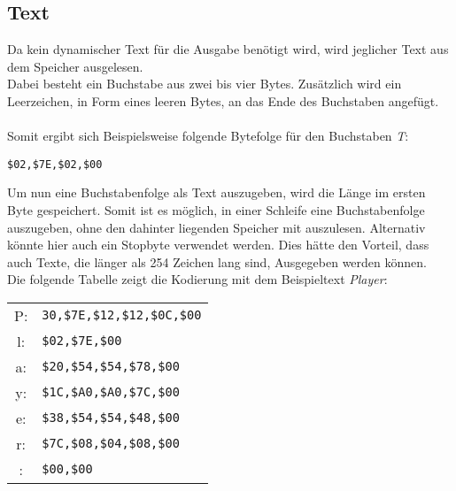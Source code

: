     \subsection{Text}
        Da kein dynamischer Text für die Ausgabe benötigt wird, wird jeglicher Text aus dem Speicher 
        ausgelesen.
        \\
        Dabei besteht ein Buchstabe aus zwei bis vier Bytes. Zusätzlich wird ein Leerzeichen,
        in Form eines leeren Bytes, an das Ende des Buchstaben angefügt.
        \\\\
        Somit ergibt sich Beispielsweise folgende Bytefolge für den Buchstaben \textit{T}:
        \begin{center}
            \texttt{\$02,\$7E,\$02,\$00}    
        \end{center}
        Um nun eine Buchstabenfolge als Text auszugeben, wird die Länge im ersten Byte gespeichert.
        Somit ist es möglich, in einer Schleife eine Buchstabenfolge auszugeben, ohne den dahinter liegenden
        Speicher mit auszulesen. Alternativ könnte hier auch ein Stopbyte verwendet werden.
        Dies hätte den Vorteil, dass auch Texte, die länger als 254 Zeichen lang sind, Ausgegeben werden können.
        \\
        Die folgende Tabelle zeigt die Kodierung mit dem Beispieltext \textit{Player}:
        \begin{center}
            \begin{tabular}{c | l}
                P: & \texttt{30,\$7E,\$12,\$12,\$0C,\$00}\\
                l: & \texttt{\$02,\$7E,\$00} \\
                a: & \texttt{\$20,\$54,\$54,\$78,\$00}\\ 
                y: & \texttt{\$1C,\$A0,\$A0,\$7C,\$00}\\ 
                e: & \texttt{\$38,\$54,\$54,\$48,\$00}\\ 
                r: & \texttt{\$7C,\$08,\$04,\$08,\$00}\\
                 : & \texttt{\$00,\$00}
            \end{tabular}
        \end{center}
      
